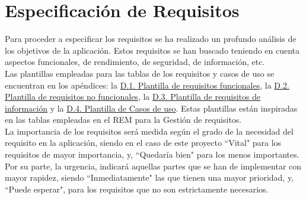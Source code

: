 \chapter{Especificación de Requisitos}
\label{enlaceespecificacion}

Para proceder a especificar los requisitos se ha realizado un profundo análisis de los objetivos de la aplicación. Estos requisitos se han buscado teniendo en cuenta aspectos funcionales, de rendimiento, de seguridad, de información, etc.
\\

Las plantillas empleadas para las tablas de los requisitos y casos de uso se encuentran en los apéndices: la \hyperref[enlaceFRQX]{D.1. Plantilla de requisitos funcionales}, la \hyperref[enlaceNFRX]{D.2. Plantilla de requisitos no funcionales}, la \hyperref[enlaceIRQX]{D.3. Plantilla de requisitos de información} y la \hyperref[enlaceUCX]{D.4. Plantilla de Casos de uso}.
Estas plantillas están inspiradas en las tablas empleadas en el REM \cite{rem} para la Gestión de requisitos.
\\

La importancia de los requisitos será medida según el grado de la necesidad del requisito en la aplicación, siendo en el caso de este proyecto ``Vital" para los requisitos de mayor importancia, y, ``Quedaría bien" para los menos importantes. Por su parte, la urgencia, indicará aquellas partes que se han de implementar con mayor rapidez, siendo ``Inmediatamente" las que tienen una mayor prioridad, y, ``Puede esperar", para los requisitos que no son estrictamente necesarios.





